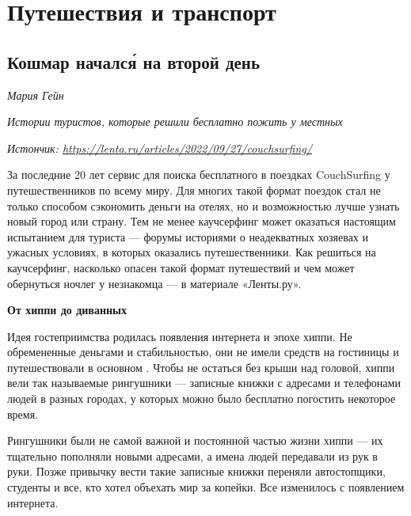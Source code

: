 \chapter{Путешествия и транспорт}

\section{Кошмар началс\'{я} на второй день}

\textit{Мария Гейн}

\textit{Истории туристов, которые решили бесплатно пожить у местных}

\textit{Истончик: \url{https://lenta.ru/articles/2022/09/27/couchsurfing/}}

За последние 20 лет сервис для поиска бесплатного  в поездках CouchSurfing  у путешественников по всему миру. Для многих такой формат поездок стал не только способом сэкономить  деньги на отелях, но и возможностью лучше узнать новый город или страну. Тем не менее каучсерфинг может оказаться настоящим испытанием для  туриста — форумы  историями о неадекватных хозяевах и ужасных условиях, в которых оказались путешественники. Как решиться на каучсерфинг, насколько опасен такой формат путешествий и чем может обернуться ночлег у незнакомца — в материале «Ленты.ру».

\textbf{От хиппи до диванных }

Идея  гостеприимства родилась  появления интернета и  эпохе хиппи. Не обремененные деньгами и стабильностью, они не имели средств на гостиницы и путешествовали в основном . Чтобы не остаться без крыши над головой, хиппи вели так называемые рингушники — записные книжки с адресами и телефонами людей в разных городах, у которых можно было бесплатно погостить некоторое время.

Рингушники были  не самой важной и постоянной частью жизни хиппи — их тщательно пополняли новыми адресами, а имена  людей передавали из рук в руки. Позже привычку вести такие записные книжки переняли автостопщики, студенты и все, кто хотел объехать мир за копейки. Все изменилось с появлением интернета.

